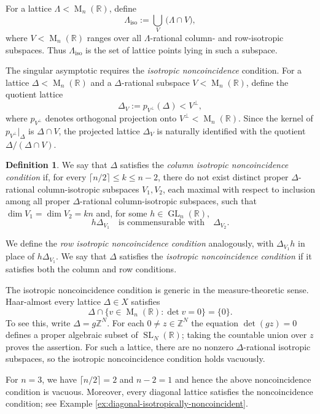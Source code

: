 \documentclass[reqno,11pt]{amsart}
\numberwithin{equation}{section}
\theoremstyle{definition}
\newtheorem{definition}[theorem]{Definition}
\theoremstyle{remark}
\newcommand{\op}{\operatorname}
\newcommand{\be}{\begin{equation}}
\newcommand{\ee}{\end{equation}}
\newcommand{\R}{\mathbb R}
\newcommand{\La}{\Lambda}
\newcommand{\br}{\mathbb R}
\newcommand{\M}{\op{M}}
\newcommand{\GL}{\op{GL}}
\newcommand{\SL}{\op{SL}}
\begin{document}
For a lattice $\La<\M_n(\br)$, define
\be\label{iso}
\Lambda_{\operatorname{iso}}
:=
\bigcup_{V}\,\bigl(\Lambda\cap V\bigr),
\ee
where $V<\M_n(\br)$ ranges over all $\Lambda$-rational column- and row-isotropic subspaces. Thus $\Lambda_{\operatorname{iso}}$ is the set of lattice points lying in such a subspace. 

The singular asymptotic requires the {\it isotropic noncoincidence} condition. For a lattice $\Delta<\M_n(\mathbb R)$ and
a $\Delta$-rational subspace $V<\M_n(\mathbb R)$, define the quotient
lattice
$$
\Delta_V:=p_{V^\perp}(\Delta)<V^\perp,
$$
where $p_{V^\perp}$ denotes orthogonal projection onto $V^\perp<\M_n(\br)$. Since the kernel of $p_{V^\perp}|_\Delta$ is $\Delta\cap V$, the
projected lattice $\Delta_V$ is naturally identified with the quotient $\Delta/(\Delta\cap V)$.
\begin{definition}
\label{def:isotropic-noncoincidence}
We say that $\Delta$ satisfies the \emph{column isotropic noncoincidence
condition} if, for every
$\lceil n/2\rceil\le k\le n-2$, there do not exist distinct proper
$\Delta$-rational column-isotropic subspaces $V_1,V_2$, each maximal
with respect to inclusion among all proper $\Delta$-rational
column-isotropic subspaces, such that
$\dim V_1=\dim V_2=kn$
and, for some $h\in\GL_n(\mathbb R)$,
$$
h\Delta_{V_1}
\quad\text{is commensurable with}\quad
\Delta_{V_2}.
$$

We define the \emph{row isotropic noncoincidence condition} analogously,
with $\Delta_{V_1}h$ in place of $h\Delta_{V_1}$. We say that $\Delta$
satisfies the \emph{isotropic noncoincidence condition} if it satisfies
both the column and row conditions.

\end{definition}
The isotropic noncoincidence condition is generic in the
measure-theoretic sense. Haar-almost every lattice
$\Delta\in X$ satisfies
$$
\Delta\cap\{v\in\M_n(\R):\det v=0\}=\{0\}.
$$
To see this, write $\Delta=g\mathbb Z^N$. For each
$0\ne z\in\mathbb Z^N$ the equation $\det(gz)=0$ defines a proper
algebraic subset of $\SL_N(\R)$; taking the countable union over $z$
proves the assertion.
For such a lattice, there are no nonzero $\Delta$-rational isotropic
subspaces, so the isotropic noncoincidence condition holds vacuously.

For $n=3$, we have $\lceil n/2\rceil=2$ and $n-2=1$ and hence
the above noncoincidence condition is vacuous. Moreover, every diagonal lattice satisfies the noncoincidence condition; see Example
\ref{ex:diagonal-isotropically-noncoincident}.
\end{document}
